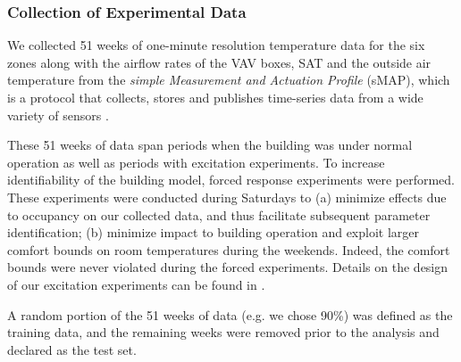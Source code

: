 
\subsubsection{Collection of Experimental Data}\label{sec:building_model_data}

We collected 51 weeks of one-minute resolution temperature data for the six zones along with the airflow rates of the VAV boxes, SAT and the outside air temperature from the \textit{simple Measurement and Actuation Profile} (sMAP), which is a protocol that collects, stores and publishes time-series data from a wide variety of sensors \cite{:ac, Dawson-Haggerty:2012aa}. 

These 51 weeks of data span periods when the building was under normal operation as well as periods with excitation experiments. To increase identifiability of the building model, forced response experiments were performed. These experiments were conducted during Saturdays to (a) minimize effects due to occupancy on our collected data, and thus facilitate subsequent parameter identification; (b) minimize impact to building operation and exploit larger comfort bounds on room temperatures during the weekends. Indeed, the comfort bounds were never violated during the forced experiments. Details on the design of our excitation experiments can be found in \cite{Qie}.

A random portion of the 51 weeks of data (e.g. we chose 90\%) was defined as the training data, and the remaining weeks were removed prior to the analysis and declared as the test set.




